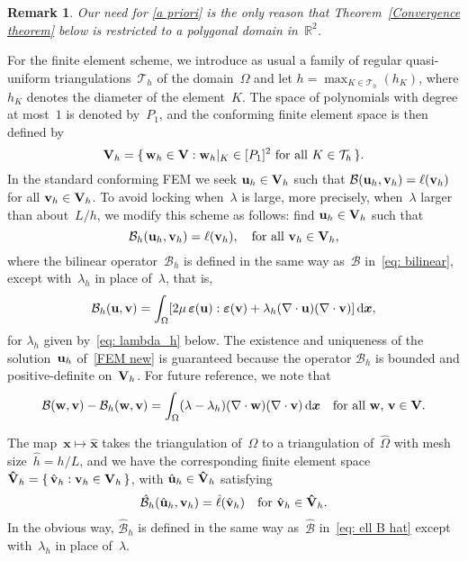 \documentclass[11pt]{article}
\newcommand{\calB}{\mathcal{B}}
\newcommand{\calBhat}{\hat{\mathcal{B}}}
\newcommand{\vu}{{\bf u}}
\newcommand{\vv}{{\bf v}}
\newcommand{\vV}{{\bf V}}
\newcommand{\vVhat}{\mathbf{\hat V}}
\newcommand{\vw}{{\bf w}}
\newcommand{\bsx}{{\boldsymbol{x}}}
\numberwithin{equation}{section}
\newcommand{\veps}{{\boldsymbol{\varepsilon}}}
\newcommand{\ud}{\mathrm{d}}
\newtheorem{remark}{Remark}[section]
\begin{document}
\begin{remark}
Our need for \eqref{a priori}  is the only reason that
Theorem~\ref{Convergence theorem} below is restricted to a polygonal domain
in~$\mathbb{R}^2$.
\end{remark}

For the finite element scheme, we introduce as usual a family of regular 
quasi-uniform triangulations~$\mathcal{T}_h$ of the domain~$\Omega$ and let 
$h=\max_{K\in \mathcal{T}_h}(h_K)$, where $h_{K}$ denotes the diameter of 
the element~$K$.  The space of polynomials with degree at most~$1$ is denoted
by~$P_1$, and the conforming finite element space is then defined by
\[\vV_h=\{\,\vw_h \in {\bf V}:\text{$\vw_h |_K \in [P_1]^2$ for all $K \in \mathcal{T}_h$}\,\}.
\]
In the standard conforming FEM we seek $\vu_h \in  \vV_h$ such that
$\calB(\vu_h, \vv_h) = \ell(\vv_h)$ for all $\vv_h \in  \vV_h$. To
avoid locking when~$\lambda$ is large, more precisely,
when~$\lambda$ larger than about~$L/h$, we modify this scheme as
follows: find $\vu_h \in  \vV_h$ such that
\begin{equation}\label{FEM new}
\calB_h(\vu_h,\vv_h)=\ell(\vv_h),\quad\text{for all $\vv_h\in\vV_h$},
\end{equation}
where the bilinear operator~$\calB_h$ is defined in the same way as~$\calB$
in~\eqref{eq: bilinear}, except with~$\lambda_h$ in place of~$\lambda$,
that is,
\begin{equation*}
\calB_h(\vu,\vv)=\int_\Omega[2\mu\,\veps(\vu):\veps(\vv)
    +\lambda_h(\nabla\cdot\vu)(\nabla\cdot\vv)]\,\ud\bsx,
\end{equation*} 
for $\lambda_h$ given by~\eqref{eq: lambda_h} below. The existence and
uniqueness of the solution~$\vu_h$ of~\eqref{FEM new} is guaranteed because the
operator $\calB_h$ is bounded and positive-definite on~$\vV_h$.  For future
reference, we note that
\begin{equation}\label{eq: B-B_h}
\calB(\vw,\vv)-\calB_h(\vw,\vv)
    =\int_\Omega (\lambda-\lambda_h)(\nabla\cdot\vw)(\nabla\cdot\vv)\,\ud\bsx
    \quad\text{for all $\vw$, $\vv\in\vV$.}
\end{equation}

The map~$\bsx\mapsto\hat\bsx$ takes the triangulation of~$\Omega$ to a
triangulation of~$\widehat\Omega$ with mesh size~$\hat h=h/L$, and we have
the corresponding finite element space
$\vVhat_h=\{\,\hat\vv_h:\vv_h\in\vV_h\,\}$, with $\hat\vu_h\in\vVhat_h$
satisfying
\[
\calBhat_h(\hat\vu_h,\vv_h)=\hat\ell(\hat\vv_h)
\quad\text{for $\hat\vv_h\in\vVhat_h$.}
\]
In the obvious way, $\calBhat_h$ is defined in the same way as~$\calBhat$
in~\eqref{eq: ell B hat} except with~$\lambda_h$ in place of~$\lambda$.
\end{document}
